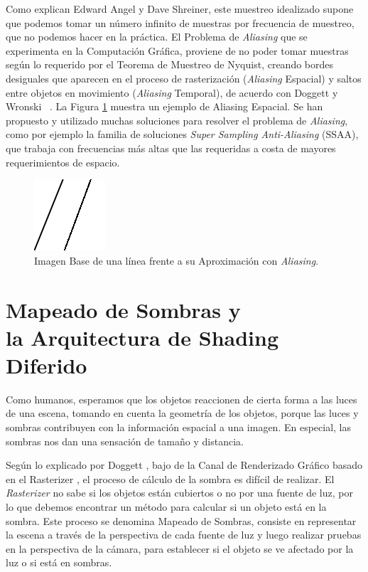 \documentclass[pregrado]{tesis-usb} %
\begin{document}
Como explican Edward Angel y Dave Shreiner, este muestreo idealizado supone que podemos tomar un número infinito de muestras por frecuencia de muestreo, que no podemos hacer en la práctica. El Problema de \textit{Aliasing} que se experimenta en la Computación Gráfica, proviene de no poder tomar muestras según lo requerido por el Teorema de Muestreo de Nyquist, creando bordes desiguales que aparecen en el proceso de rasterización (\textit{Aliasing} Espacial) y saltos entre objetos en movimiento (\textit{Aliasing} Temporal), de acuerdo con Doggett y Wronski ~\cite{Doggett2017EDAN35, Wronski2014}. La Figura \ref{fig:aliasingexample} muestra un ejemplo de Aliasing Espacial. Se han propuesto y utilizado muchas soluciones para resolver el problema de \textit{Aliasing}, como por ejemplo la familia de soluciones \textit{Super Sampling Anti-Aliasing} (SSAA), que trabaja con frecuencias más altas que las requeridas a costa de mayores requerimientos de espacio.

\begin{figure}[!hbt]
	\centering
	\includegraphics[scale=0.6]{images/aliasing_example.png} 
	\caption{Imagen Base de una línea frente a su Aproximación con \textit{Aliasing}.}\label{fig:aliasingexample}
\end{figure}

\section[Mapeado de Sombras y la Arquitectura de Shading Diferido]{Mapeado de Sombras y \\ la Arquitectura de Shading Diferido}

Como humanos, esperamos que los objetos reaccionen de cierta forma a las luces de una escena, tomando en cuenta la geometría de los objetos, porque las luces y sombras contribuyen con la información espacial a una imagen. En especial, las sombras nos dan una sensación de tamaño y distancia.

Según lo explicado por Doggett \cite{Doggett2017EDAN35}, bajo de la Canal de Renderizado Gráfico basado en el Rasterizer , el proceso de cálculo de la sombra es difícil de realizar. El \textit{Rasterizer} no sabe si los objetos están cubiertos o no por una fuente de luz, por lo que debemos encontrar un método para calcular si un objeto está en la sombra. Este proceso se denomina Mapeado de Sombras, consiste en representar la escena a través de la perspectiva de cada  fuente de luz y luego realizar pruebas en la perspectiva de la cámara, para establecer si el objeto se ve afectado por la luz o si está en sombras.
\end{document}
